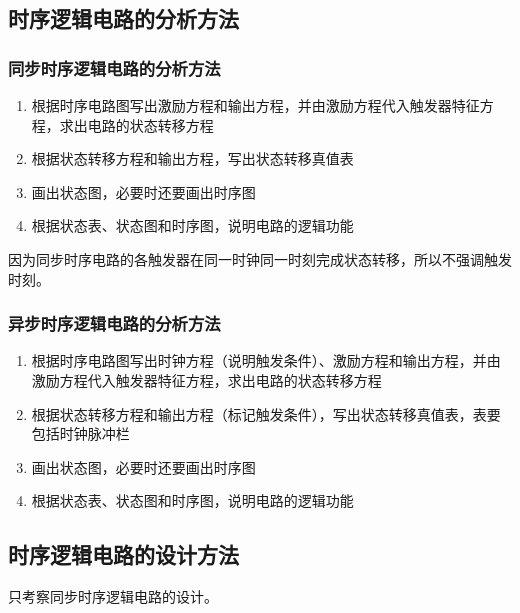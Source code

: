 \documentclass{ctexart}
\begin{document}
\subsection{时序逻辑电路的分析方法}
\subsubsection{同步时序逻辑电路的分析方法}
\begin{enumerate}
    \item 根据时序电路图写出激励方程和输出方程，并由激励方程代入触发器特征方程，求出电路的状态转移方程
    \item 根据状态转移方程和输出方程，写出状态转移真值表
    \item 画出状态图，必要时还要画出时序图
    \item 根据状态表、状态图和时序图，说明电路的逻辑功能
\end{enumerate}
因为同步时序电路的各触发器在同一时钟同一时刻完成状态转移，所以不强调触发时刻。
\subsubsection{异步时序逻辑电路的分析方法}
\begin{enumerate}
    \item 根据时序电路图写出时钟方程（说明触发条件）、激励方程和输出方程，并由激励方程代入触发器特征方程，求出电路的状态转移方程
    \item 根据状态转移方程和输出方程（标记触发条件），写出状态转移真值表，表要包括时钟脉冲栏
    \item 画出状态图，必要时还要画出时序图
    \item 根据状态表、状态图和时序图，说明电路的逻辑功能
\end{enumerate}
\subsection{时序逻辑电路的设计方法}
只考察同步时序逻辑电路的设计。
\end{document}
